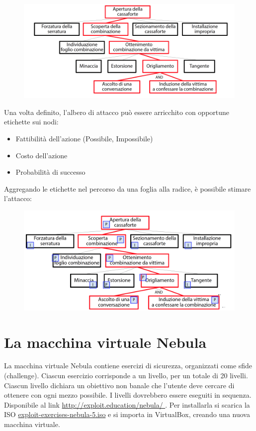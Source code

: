 \begin{figure}[hbpt!]
    \centering
    \includegraphics[width=0.8 \textwidth]{./Images/cap5/5.1.png}
\end{figure}
\FloatBarrier

Una volta definito, l'albero di attacco può
essere arricchito con opportune etichette sui
nodi:
\begin{itemize}
    \item Fattibilità dell'azione (Possibile, Impossibile)
    \item Costo dell'azione
    \item Probabilità di successo
\end{itemize}
Aggregando le etichette nel percorso da una
foglia alla radice, è possibile stimare l'attacco:

\begin{figure}[hbpt!]
    \centering
    \includegraphics[width=0.8 \textwidth]{./Images/cap5/5.2.png}
\end{figure}
\FloatBarrier

\section{La macchina virtuale Nebula}
La macchina virtuale Nebula contiene esercizi
di sicurezza, organizzati come sfide (challenge). Ciascun esercizio corrisponde a un livello, per
un totale di 20 livelli. Ciascun livello dichiara un obiettivo non banale che
l'utente deve cercare di ottenere con ogni mezzo
possibile. I livelli dovrebbero essere eseguiti in sequenza. Disponibile al link \href{http://exploit.education/nebula/ }{http://exploit.education/nebula/ }. Per installarla si scarica la ISO \href{ http://exploit.education/downloads/}{exploit-exercises-nebula-5.iso} e si importa in VirtualBox, creando una nuova macchina virtuale.


